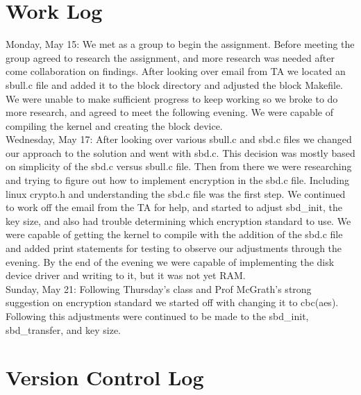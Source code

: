 \documentclass[letterpaper,10pt,serif,draftclsnofoot,onecolumn,compsoc,titlepage]{IEEEtran}
\begin{document}
\section{Work Log}
Monday, May 15: We met as a group to begin the assignment. Before meeting the group agreed to research the assignment, and more research was needed after come collaboration on findings. After looking over email from TA we located an sbull.c file and added it to the block directory and adjusted the block Makefile. We were unable to make sufficient progress to keep working so we broke to do more research, and agreed to meet the following evening. We were capable of compiling the kernel and creating the block device. \\
Wednesday, May 17: After looking over various sbull.c and sbd.c files we changed our approach to the solution and went with sbd.c. This decision was mostly based on simplicity of the sbd.c versus sbull.c file. Then from there we were researching and trying to figure out how to implement encryption in the sbd.c file. Including linux crypto.h and understanding the sbd.c file was the first step. We continued to work off the email from the TA for help, and started to adjust sbd\_init, the key size, and also had trouble determining which encryption standard to use. We were capable of getting the kernel to compile with the addition of the sbd.c file and added print statements for testing to observe our adjustments through the evening. By the end of the evening we were capable of implementing the disk device driver and writing to it, but it was not yet RAM. \\
Sunday, May 21: Following Thursday's class and Prof McGrath's strong suggestion on encryption standard we started off with changing it to cbc(aes). Following this adjustments were continued to be made to the sbd\_init, sbd\_transfer, and key size. \\

\section{Version Control Log}
\end{document}
